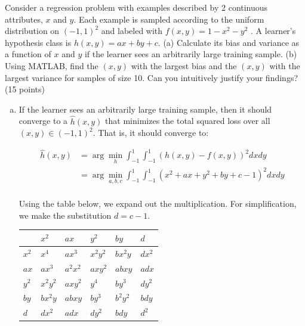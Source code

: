 \documentclass[fleqn]{homework}
\begin{document}
  \begin{problem}{3}
    \begin{question}
      Consider a regression problem with examples described by 2 continuous
      attributes, $x$ and $y$.  Each example is sampled according to the uniform
      distribution on $(-1,1)^2$ and labeled with $f(x,y)=1 - x^2 - y^2$ . A
      learner’s hypothesis class is $h(x,y)=ax+by+c$. (a) Calculate its bias and
      variance as a function of $x$ and $y$ if the learner sees an arbitrarily
      large training sample. (b) Using MATLAB, find the $(x,y)$ with the largest
      bias and the $(x,y)$ with the largest variance for samples of size 10. Can
      you intuitively justify your findings? (15 points)
    \end{question}

    \begin{enumerate}[(a)]
    \item If the learner sees an arbitrarily large training sample, then it
      should converge to a $\hat{h}(x,y)$ that minimizes the total squared loss
      over all $(x,y) \in (-1,1)^2$.  That is, it should converge to:

      \begin{align*}
        \hat{h}(x,y) &= \arg \min_{h} \int_{-1}^1\int_{-1}^1 (h(x,y) - f(x,y))^2 dx dy \\
        &= \arg \min_{a,b,c} \int_{-1}^1\int_{-1}^1 (x^2 + ax + y^2 + by + c-1)^2 dx dy \\
      \end{align*}

      Using the table below, we expand out the multiplication.  For
      simplification, we make the substitution $d=c-1$.

      \begin{tabular}{l|lllll}
              &$x^2$     & $ax$     & $y^2$    & $by$    & $d$     \\
        \hline
        $x^2$ & $x^4$    & $ax^3$   & $x^2y^2$ & $bx^2y$  & $dx^2$ \\
        $ax$  & $ax^3$   & $a^2x^2$ & $axy^2$  & $abxy$   & $adx$  \\
        $y^2$ & $x^2y^2$ & $axy^2$  & $y^4$    & $by^3$   & $dy^2$ \\
        $by$  & $bx^2y$  & $abxy$  & $by^3$   &  $b^2y^2$ & $bdy$ \\
        $d$   & $dx^2$   & $adx$   & $dy^2$   &  $bdy$    & $d^2$ \\
      \end{tabular}


\end{enumerate}
\end{problem}
\end{document}
